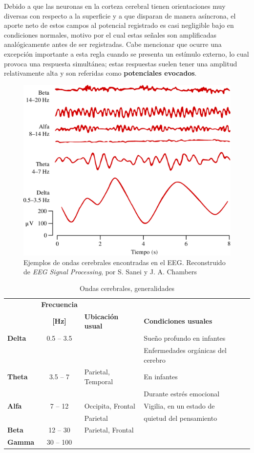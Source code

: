 Debido a que las neuronas en la corteza cerebral tienen orientaciones muy diversas con respecto a 
la superficie y a que disparan de manera asíncrona, el aporte neto de estos campos al potencial 
registrado es casi negligible bajo en condiciones normales, motivo por el cual estas señales son
amplificadas analógicamente antes de ser registradas.
%
Cabe mencionar que ocurre una excepción importante a esta regla cuando se presenta un estímulo
externo, lo cual provoca una respuesta simultánea; estas respuestas suelen tener una amplitud 
relativamente alta y son referidas como \textbf{potenciales evocados}.

\begin{figure}
\centering
\includegraphics[width=0.55\linewidth]{./img_diagramas/ritmos_hechos.pdf} 
\caption{Ejemplos de ondas cerebrales encontradas en el EEG. Reconstruido de \textit{EEG Signal 
Processing}, por S. Sanei y J. A. Chambers \cite{Sanei07} }
\label{ritmos}
\end{figure}

\begin{table}
\centering
\begin{tabular}{lclll}
\toprule
&\textbf{Frecuencia} && \\
&\textbf{[Hz]} & \textbf{Ubicación usual} & \textbf{Condiciones usuales} \\
\midrule
\textbf{Delta} & 0.5 -- 3.5 && Sueño profundo en infantes\\
&&& Enfermedades orgánicas del cerebro\\
\textbf{Theta} & 3.5 -- 7   & Parietal, Temporal & En infantes\\
&&& Durante estrés emocional \\
\textbf{Alfa}  & 7 -- 12    & Occipita, Frontal& Vigilia, en un estado de \\
&& Parietal & quietud del pensamiento\\
\textbf{Beta}  & 12 -- 30   &Parietal, Frontal&\\
\textbf{Gamma} & 30 -- 100  &&\\
\bottomrule
\end{tabular}
\caption{Ondas cerebrales, generalidades}
\label{tabla_ondas}
\end{table}


